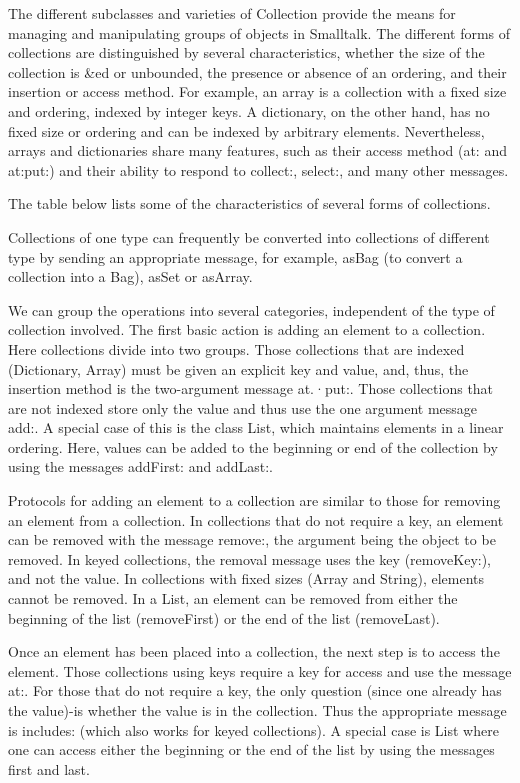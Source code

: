 
The different subclasses and varieties of Collection provide the means for
managing and manipulating groups of objects in Smalltalk. The different
forms of collections are distinguished by several characteristics, whether
the size of the collection is \&ed or unbounded, the presence or absence
of an ordering, and their insertion or access method. For example, an array
is a collection with a fixed size and ordering, indexed by integer keys. A
dictionary, on the other hand, has no fixed size or ordering and can be
indexed by arbitrary elements. Nevertheless, arrays and dictionaries share
many features, such as their access method (at: and at:put:) and their ability
to respond to collect:, select:, and many other messages.

The table below lists some of the characteristics of several forms of
collections.


Collections of one type can frequently be converted into collections of
different type by sending an appropriate message, for example, asBag (to
convert a collection into a Bag), asSet or asArray.

We can group the operations into several categories, independent of
the type of collection involved. The first basic action is adding an element
to a collection. Here collections divide into two groups. Those collections
that are indexed (Dictionary, Array) must be given an explicit key and
value, and, thus, the insertion method is the two-argument message at.·put:.
Those collections that are not indexed store only the value and thus use
the one argument message add:. A special case of this is the class List,
which maintains elements in a linear ordering. Here, values can be added
to the beginning or end of the collection by using the messages addFirst:
and addLast:.

Protocols for adding an element to a collection are similar to those for
removing an element from a collection. In collections that do not require
a key, an element can be removed with the message remove:, the argument
being the object to be removed. In keyed collections, the removal message
uses the key (removeKey:), and not the value. In collections with fixed sizes
(Array and String), elements cannot be removed. In a List, an element
can be removed from either the beginning of the list (removeFirst) or the
end of the list (removeLast).

Once an element has been placed into a collection, the next step is to
access the element. Those collections using keys require a key for access
and use the message at:. For those that do not require a key, the only
question (since one already has the value)-is whether the value is in the
collection. Thus the appropriate message is includes: (which also works
for keyed collections). A special case is List where one can access either
the beginning or the end of the list by using the messages first and last.


